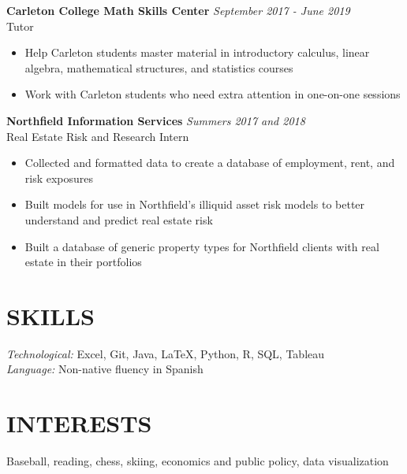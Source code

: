 \documentclass[margin, 9pt]{res} %
\begin{document}
\begin{resume}
{\sl} \textbf{Carleton College Math Skills Center} \hfill \textit{September 2017 - June 2019}\\
{\sl} Tutor \smallskip
{\sl} \begin{itemize}
\item Help Carleton students master material in introductory calculus, linear algebra, mathematical structures, and statistics courses
\item Work with Carleton students who need extra attention in one-on-one sessions
\end{itemize}

{\sl} \textbf{Northfield Information Services} \hfill \textit{Summers 2017 and 2018}\\
{\sl} Real Estate Risk and Research Intern \smallskip
{\sl} \begin{itemize}
\item Collected and formatted data to create a database of employment, rent, and risk exposures
\item Built models for use in Northfield's illiquid asset risk models to better understand and predict real estate risk
\item Built a database of generic property types for Northfield clients with real estate in their portfolios
\end{itemize}


\section{SKILLS}
{\sl Technological:} Excel, Git, Java, LaTeX, Python, R, SQL, Tableau \smallskip \\
{\sl Language:} Non-native fluency in Spanish

\section{INTERESTS}
{\sl} Baseball, reading, chess, skiing, economics and public policy, data visualization

\end{resume}
\end{document}
